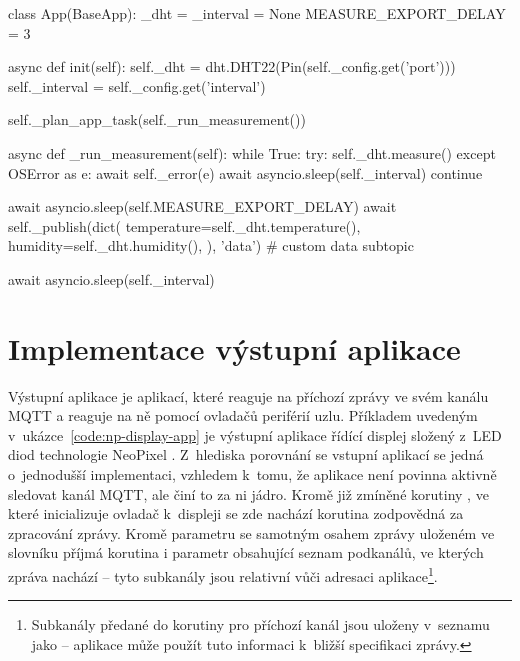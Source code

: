 \begin{code}[
    language=Python,
    caption={Implementace vstupní aplikace pro měření teploty a vlhkosti pomocí senzoru DHT -- inicializační metoda
    \ic{init} načítá parametry z~přijaté konfigurace a inicializuje řadič pro DHT senzor.
    Asynchronní měřící smyčka následně požádá ovladač o~změření, počká a vyexportuje data.
    \textit{Kód aplikace je pro zachování jednoduchosti zkrácen a upraven.}},
    label=code:dht-sensor-app
]
class App(BaseApp):
    _dht = _interval = None
    MEASURE_EXPORT_DELAY = 3

    async def init(self):
        self._dht = dht.DHT22(Pin(self._config.get('port')))
        self._interval = self._config.get('interval')

        self._plan_app_task(self._run_measurement())

    async def _run_measurement(self):
        while True:
            try:
                self._dht.measure()
            except OSError as e:
                await self._error(e)
                await asyncio.sleep(self._interval)
                continue

            await asyncio.sleep(self.MEASURE_EXPORT_DELAY)
            await self._publish(dict(
                temperature=self._dht.temperature(),
                humidity=self._dht.humidity(),
            ), 'data')  # custom data subtopic

            await asyncio.sleep(self._interval)
\end{code}

\section{Implementace výstupní aplikace}\label{subsec:implementace-vystupni-aplikace}

Výstupní aplikace je aplikací, které reaguje na příchozí zprávy ve svém kanálu MQTT a reaguje na ně pomocí ovladačů
periférií uzlu. Příkladem uvedeným v~ukázce~\ref{code:np-display-app} je výstupní aplikace řídící displej složený z~LED
diod technologie NeoPixel \cite{Esp32KolbansBook}.
Z~hlediska porovnání se vstupní aplikací se jedná o~jednodušší implementaci, vzhledem k~tomu, že aplikace není povinna
aktivně sledovat kanál MQTT, ale činí to za ni jádro. Kromě již zmíněné korutiny , ve které inicializuje
ovladač k~displeji se zde nachází korutina  zodpovědná za zpracování zprávy.
Kromě parametru  se samotným osahem zprávy uloženém ve slovníku příjmá korutina i parametr obsahující
seznam podkanálů, ve kterých zpráva nachází -- tyto subkanály jsou relativní vůči adresaci aplikace\footnote{Subkanály
předané do korutiny  pro příchozí kanál  jsou uloženy v~seznamu
jako  -- aplikace může použít tuto informaci k~bližší specifikaci zprávy.}.

